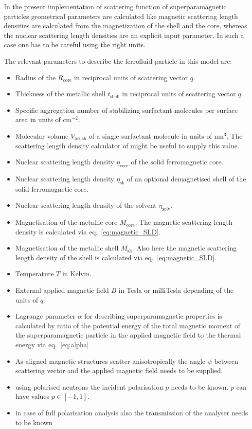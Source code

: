 In the present implementation of scattering function of
superparamagnetic particles geometrical parameters are calculated
like magnetic scattering length densities are calculated from the
magnetization of the shell and the core, whereas the nuclear
scattering length densities are an explicit input parameter. In such
a case one has to be careful using the right units.

The relevant parameters to describe the ferrofluid particle in this
model are:
\begin{itemize}
\item Radius of the $R_\text{core}$ in reciprocal units of scattering vector $q$.
\item Thickness of the metallic shell $t_\text{shell}$ in reciprocal units of scattering vector $q$.
\item Specific aggregation number of stabilizing surfactant molecules per surface area in units of cm$^{-2}$.
\item Molecular volume $V_\text{brush}$ of a single surfactant molecule in units of nm$^3$.
The scattering length density calculator of \SASfit might be useful
to supply this value.
\item Nuclear scattering length density $\eta_\text{core}$ of the solid ferromagnetic core.
\item Nuclear scattering length density $\eta_\text{sh}$ of an optional demagnetised shell of the
solid ferromagnetic core.
\item Nuclear scattering length density of the solvent $\eta_\text{solv}$.
\item Magnetisation of the metallic core $M_\text{core}$.
      The magnetic scattering length density is calculated via eq.\ \ref{eq:magnetic_SLD}.
\item Magnetisation of the metallic shell $M_\text{sh}$.
      Also here the magnetic scattering length density of the shell is calculated via eq.\ \ref{eq:magnetic_SLD}.
\item Temperature $T$ in Kelvin.
\item External applied magnetic field $B$ in Tesla or milliTesla depending of the units of $q$.
\item Lagrange parameter $\alpha$ for describing superparamagnetic properties is calculated by ratio
of the potential energy of the total magnetic moment of the superparamagnetic particle in the applied magnetic
field to the thermal energy via eq.\ \ref{eq:alpha}
\item As aligned magnetic structures scatter anisotropically the angle $\psi$ between scattering vector
and the applied magnetic field needs to be supplied.
\item using polarised neutrons the incident polarisation $p$ needs to be known. $p$ can have values $p \in [-1,1]$.
\item in case of full polarisation analysis also the transmission of the analyser needs to be known
\end{itemize}

